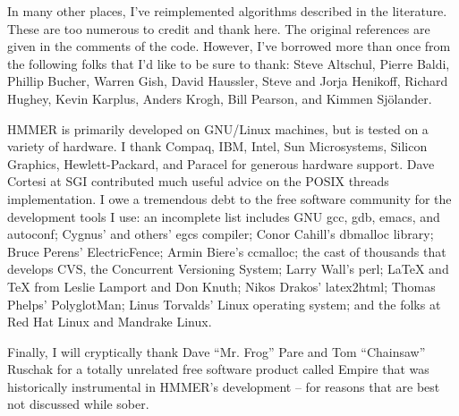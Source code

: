 In many other places, I've reimplemented algorithms described in the
literature. These are too numerous to credit and thank here. The
original references are given in the comments of the code. However,
I've borrowed more than once from the following folks that I'd like to
be sure to thank: Steve Altschul, Pierre Baldi, Phillip Bucher, Warren
Gish, David Haussler, Steve and Jorja Henikoff, Richard Hughey, Kevin
Karplus, Anders Krogh, Bill Pearson, and Kimmen Sj\"{o}lander.

HMMER is primarily developed on GNU/Linux machines, but is tested on a
variety of hardware. I thank Compaq, IBM, Intel, Sun Microsystems,
Silicon Graphics, Hewlett-Packard, and Paracel for generous hardware
support. Dave Cortesi at SGI contributed much useful advice on the
POSIX threads implementation. I owe a tremendous debt to the free
software community for the development tools I use: an incomplete list
includes GNU gcc, gdb, emacs, and autoconf; Cygnus' and others' egcs
compiler; Conor Cahill's dbmalloc library; Bruce Perens'
ElectricFence; Armin Biere's ccmalloc; the cast of thousands that
develops CVS, the Concurrent Versioning System; Larry Wall's perl;
LaTeX and TeX from Leslie Lamport and Don Knuth; Nikos Drakos'
latex2html; Thomas Phelps' PolyglotMan; Linus Torvalds' Linux
operating system; and the folks at Red Hat Linux and Mandrake Linux.

Finally, I will cryptically thank Dave ``Mr. Frog'' Pare and Tom
``Chainsaw'' Ruschak for a totally unrelated free software product
called Empire that was historically instrumental in HMMER's
development -- for reasons that are best not discussed while sober.

\label{manualend}